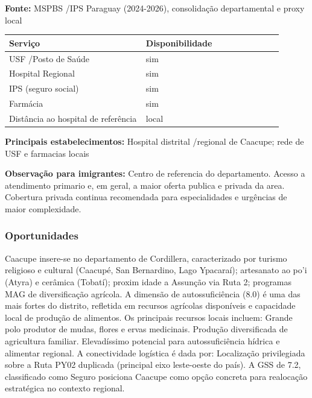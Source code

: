 \textbf{Fonte:} MSPBS /\allowbreak  IPS Paraguay (2024-2026), consolidação
departamental e proxy local

{\def\LTcaptype{none} %
\begin{longtable}{@{}>{\raggedright\arraybackslash}p{0.45\linewidth} >{\raggedright\arraybackslash}p{0.45\linewidth}@{}}
\toprule\noalign{}
Serviço & Disponibilidade \\
\midrule\noalign{}
\endhead
\bottomrule\noalign{}
\endlastfoot
USF /\allowbreak  Posto de Saúde & sim \\
Hospital Regional & sim \\
IPS (seguro social) & sim \\
Farmácia & sim \\
Distância ao hospital de referência & local \\
\end{longtable}
}

\textbf{Principais estabelecimentos:} Hospital distrital /\allowbreak  regional de
Caacupe; rede de USF e farmacias locais

\textbf{Observação para imigrantes:} Centro de referencia do
departamento. Acesso a atendimento primario e, em geral, a maior oferta
publica e privada da area. Cobertura privada continua recomendada para
especialidades e urgências de maior complexidade.
\newpage

\subsubsection*{Oportunidades}\label{oport-caacupe-0301}
Caacupe insere-se no departamento de Cordillera, caracterizado por turismo religioso e cultural (Caacupé, San Bernardino, Lago Ypacaraí); artesanato ao po'i (Atyra) e cerâmica (Tobatí); proxim idade a Assunção via Ruta 2; programas MAG de diversificação agrícola. A dimensão de autossuficiência (8.0) é uma das mais fortes do distrito, refletida em recursos agrícolas disponíveis e capacidade local de produção de alimentos. Os principais recursos locais incluem: Grande polo produtor de mudas, flores e ervas medicinais. Produção diversificada de agricultura familiar. Elevadíssimo potencial para autossuficiência hídrica e alimentar regional. A conectividade logística é dada por: Localização privilegiada sobre a Ruta PY02 duplicada (principal eixo leste-oeste do país). A GSS de 7.2, classificado como Seguro posiciona Caacupe como opção concreta para realocação estratégica no contexto regional.

